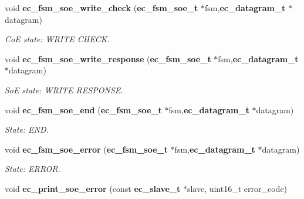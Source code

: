 \begin{DoxyCompactItemize}
void {\bf ec\-\_\-fsm\-\_\-soe\-\_\-write\-\_\-check} ({\bf ec\-\_\-fsm\-\_\-soe\-\_\-t} $\ast$fsm,{\bf ec\-\_\-datagram\-\_\-t} $\ast$datagram)
\begin{DoxyCompactList}\small\item\em Co\-E state\-: W\-R\-I\-T\-E C\-H\-E\-C\-K. \end{DoxyCompactList}\item 
void {\bf ec\-\_\-fsm\-\_\-soe\-\_\-write\-\_\-response} ({\bf ec\-\_\-fsm\-\_\-soe\-\_\-t} $\ast$fsm,{\bf ec\-\_\-datagram\-\_\-t} $\ast$datagram)
\begin{DoxyCompactList}\small\item\em So\-E state\-: W\-R\-I\-T\-E R\-E\-S\-P\-O\-N\-S\-E. \end{DoxyCompactList}\item 
void {\bf ec\-\_\-fsm\-\_\-soe\-\_\-end} ({\bf ec\-\_\-fsm\-\_\-soe\-\_\-t} $\ast$fsm,{\bf ec\-\_\-datagram\-\_\-t} $\ast$datagram)
\begin{DoxyCompactList}\small\item\em State\-: E\-N\-D. \end{DoxyCompactList}\item 
void {\bf ec\-\_\-fsm\-\_\-soe\-\_\-error} ({\bf ec\-\_\-fsm\-\_\-soe\-\_\-t} $\ast$fsm,{\bf ec\-\_\-datagram\-\_\-t} $\ast$datagram)
\begin{DoxyCompactList}\small\item\em State\-: E\-R\-R\-O\-R. \end{DoxyCompactList}\item 
void {\bf ec\-\_\-print\-\_\-soe\-\_\-error} (const {\bf ec\-\_\-slave\-\_\-t} $\ast$slave, uint16\-\_\-t error\-\_\-code)\label{fsm__soe_8c_aac6e087c335a755f1ce0ada566734be4}


\end{DoxyCompactItemize}
